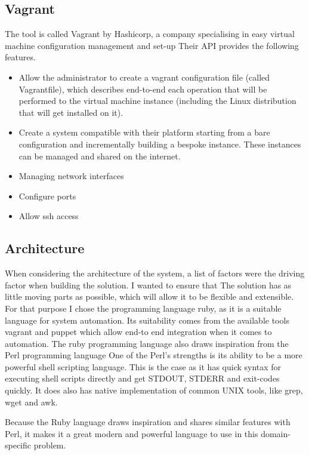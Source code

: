 \documentclass{article}
\begin{document}
\subsection{Vagrant}
The tool is called Vagrant by Hashicorp, a company specialising in easy virtual machine configuration management and set-up Their API provides the following features.

\begin{itemize}
    \item
          Allow the administrator to create a \gls{vagrant} configuration file (called Vagrantfile), which describes end-to-end each operation that will be performed to the virtual machine instance (including the Linux distribution that will get installed on it).
    \item
          Create a system compatible with their platform starting from a bare configuration and incrementally building a bespoke instance. These instances can be managed and shared on the internet.
    \item
          Managing network interfaces
    \item
          Configure ports
    \item
          Allow \gls{ssh} access
\end{itemize}

\subsection{Architecture}
When considering the architecture of the system, a list of factors were the driving factor when building the solution. I wanted to ensure that The solution has as little moving parts as possible, which will allow it to be flexible and extensible. For that purpose I chose the programming language \gls{ruby}, as it is a suitable language for system automation. Its suitability comes from the available tools \gls{vagrant} and \gls{puppet} which allow end-to end integration when it comes to automation. The \gls{ruby} programming language also draws inspiration from the Perl programming language One of the Perl's strengths is its ability to be a more powerful shell scripting language. This is the case as it has quick syntax for executing shell scripts directly and get STDOUT, STDERR and exit-codes quickly. It does also has native implementation of common UNIX tools, like grep, wget and awk.

Because the Ruby language draws inspiration and shares similar features with Perl, it makes it a great modern and powerful language to use in this domain-specific problem.
\end{document}
